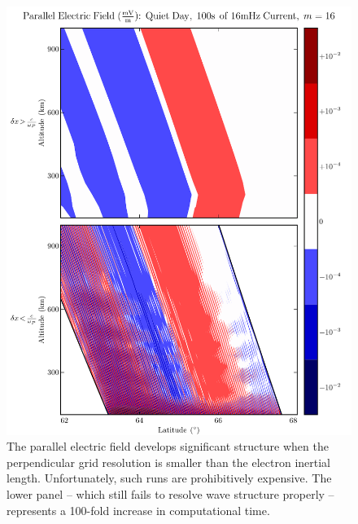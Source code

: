 \begin{figure}[H]
    \centering
    \includegraphics[width=\textwidth]{figures/Ez_inertial_length.pdf}
    \caption[Parallel Electric Fields by Perpendicular Grid Resolution]{
      The parallel electric field develops significant structure when the perpendicular grid resolution is smaller than the electron inertial length. Unfortunately, such runs are prohibitively expensive. The lower panel -- which still fails to resolve wave structure properly -- represents a 100-fold increase in computational time. 
    }
    \label{fig_Ez_inertial_length}
\end{figure}





